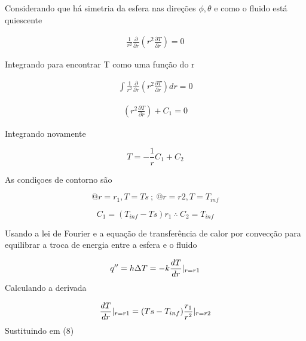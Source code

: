 \documentclass[12pt]{article}
\begin{document}
Considerando que há simetria da esfera nas direções $\phi , \theta$ e como o fluido está quiescente

\begin{equation}
	\begin{aligned}
		 \frac{1}{r^2} \frac{\partial}{\partial r} \left( r^2 \frac{\partial T}{\partial r} \right) = 0 
	\end{aligned}
\end{equation}

Integrando para encontrar T como uma função do r


\begin{equation}
	\begin{aligned}
		\int \frac{1}{r^2} \frac{\partial}{\partial r} \left( r^2 \frac{\partial T}{\partial r} \right)dr = 0 
	\end{aligned}
\end{equation}


\begin{equation}
	\begin{aligned}
		 \left( r^2 \frac{\partial T}{\partial r} \right) + C_{1} = 0
	\end{aligned}
\end{equation}

Integrando novamente

\begin{equation}
	T = -\frac{1}{r}C_{1} + C_{2}
\end{equation}

As condiçoes de contorno são

\begin{equation}
	 @ r = r_{1} , T = Ts \ ; \ @r = r2, T = T_{inf} 
\end{equation}


\begin{equation}
	C_{1} =  (T_{inf}-Ts ) r_{1} \ \therefore \ C_{2} = T_{inf} 
\end{equation}

Usando a lei de Fourier e a equação de transferência de calor por convecção para equilibrar a troca de energia entre a esfera e o fluido

\begin{equation}
	q'' = h\Delta T = -k \frac{dT}{dr}\arrowvert_{r = r1} 
\end{equation}
Calculando a derivada

\begin{equation}
	\frac{dT}{dr}\arrowvert_{r = r1} = (Ts - T_{inf})\frac{r_{1}}{r^{2}}\arrowvert_{r = r2}
\end{equation}
Sustituindo em (8)
\end{document}
